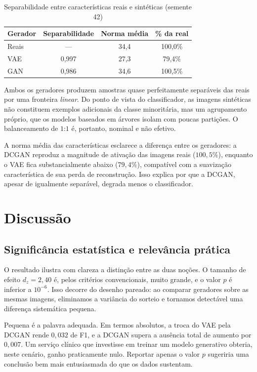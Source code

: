 \documentclass[conference]{IEEEtran}
\begin{document}
\begin{table}[t]
\centering
\caption{Separabilidade entre características reais e sintéticas (semente 42)}
\label{tab:separabilidade}
\begin{tabular}{lccc}
\toprule
Gerador & Separabilidade & Norma média & \% da real \\
\midrule
Reais & --- & 34,4 & 100,0\% \\
VAE   & 0,997 & 27,3 & 79,4\% \\
GAN   & 0,986 & 34,6 & 100,5\% \\
\bottomrule
\end{tabular}
\end{table}

Ambos os geradores produzem amostras quase perfeitamente separáveis das reais
por uma fronteira \emph{linear}. Do ponto de vista do classificador, as imagens
sintéticas não constituem exemplos adicionais da classe minoritária, mas um
agrupamento próprio, que os modelos baseados em árvores isolam com poucas
partições. O balanceamento de $1$:$1$ é, portanto, nominal e não efetivo.

A norma média das características esclarece a diferença entre os geradores: a
DCGAN reproduz a magnitude de ativação das imagens reais ($100{,}5\%$),
enquanto o VAE fica substancialmente abaixo ($79{,}4\%$), compatível com a
suavização característica de sua perda de reconstrução. Isso explica por que a
DCGAN, apesar de igualmente separável, degrada menos o classificador.

\section{Discussão}

\subsection{Significância estatística e relevância prática}

O resultado ilustra com clareza a distinção entre as duas noções. O tamanho de
efeito $d_z = 2{,}40$ é, pelos critérios convencionais, muito grande, e o valor
$p$ é inferior a $10^{-6}$. Isso decorre do desenho pareado: ao comparar
geradores sobre as mesmas imagens, eliminamos a variância do sorteio e tornamos
detectável uma diferença sistemática pequena.

Pequena é a palavra adequada. Em termos absolutos, a troca do VAE pela DCGAN
rende $0{,}032$ de F1, e a DCGAN supera a ausência total de aumento por
$0{,}007$. Um serviço clínico que investisse em treinar um modelo generativo
obteria, neste cenário, ganho praticamente nulo. Reportar apenas o valor $p$
sugeriria uma conclusão bem mais entusiasmada do que os dados sustentam.
\end{document}
